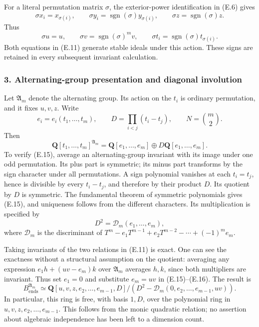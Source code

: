 \documentclass[
  10pt,
]{article}
\begin{document}
For a literal permutation matrix \(\sigma\), the exterior-power
identification in (E.6) gives \[
\sigma x_i=x_{\sigma(i)},\qquad
\sigma y_i=\operatorname{sgn}(\sigma)y_{\sigma(i)},\qquad
\sigma z=\operatorname{sgn}(\sigma)z.
\tag{E.12}
\] Thus \[
\sigma u=u,\qquad \sigma v=\operatorname{sgn}(\sigma)^m v,
\qquad \sigma t_i=\operatorname{sgn}(\sigma)t_{\sigma(i)}.
\tag{E.13}
\] Both equations in (E.11) generate stable ideals under this action.
These signs are retained in every subsequent invariant calculation.

\subsubsection{3. Alternating-group presentation and diagonal
involution}\label{alternating-group-presentation-and-diagonal-involution}

Let \(\mathfrak A_m\) denote the alternating group. Its action on the
\(t_i\) is ordinary permutation, and it fixes \(u,v,z\). Write \[
e_i=e_i(t_1,\ldots,t_m),\qquad
D=\prod_{i<j}(t_i-t_j),\qquad N=\binom m2.
\tag{E.14}
\] Then \[
\mathbf Q[t_1,\ldots,t_m]^{\mathfrak A_m}
=\mathbf Q[e_1,\ldots,e_m]\oplus D\mathbf Q[e_1,\ldots,e_m].
\tag{E.15}
\] To verify (E.15), average an alternating-group invariant with its
image under one odd permutation. Its plus part is symmetric; its minus
part transforms by the sign character under all permutations. A sign
polynomial vanishes at each \(t_i=t_j\), hence is divisible by every
\(t_i-t_j\), and therefore by their product \(D\). Its quotient by \(D\)
is symmetric. The fundamental theorem of symmetric polynomials gives
(E.15), and uniqueness follows from the different characters. Its
multiplication is specified by \[
D^2=\mathcal D_m(e_1,\ldots,e_m),
\tag{E.16}
\] where \(\mathcal D_m\) is the discriminant of
\(T^m-e_1T^{m-1}+e_2T^{m-2}-\cdots+(-1)^m e_m\).

Taking invariants of the two relations in (E.11) is exact. One can see
the exactness without a structural assumption on the quotient: averaging
any expression \(e_1h+(uv-e_m)k\) over \(\mathfrak A_m\) averages
\(h,k\), since both multipliers are invariant. Thus set \(e_1=0\) and
substitute \(e_m=uv\) in (E.15)--(E.16). The result is \[
\boxed{
B_{\mathrm{ends}}^{\mathfrak A_m}
\simeq
\mathbf Q[u,v,z,e_2,\ldots,e_{m-1},D]
\big/(D^2-\mathcal D_m(0,e_2,\ldots,e_{m-1},uv)).}
\tag{E.17}
\] In particular, this ring is free, with basis \(1,D\), over the
polynomial ring in \(u,v,z,e_2,\ldots,e_{m-1}\). This follows from the
monic quadratic relation; no assertion about algebraic independence has
been left to a dimension count.
\end{document}
